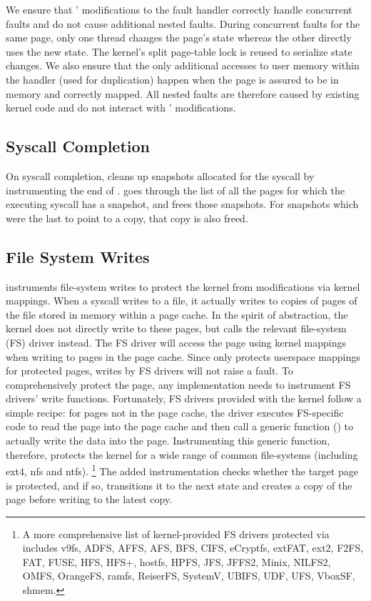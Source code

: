 We ensure that \midas' modifications to the fault handler
correctly handle concurrent faults and do not cause additional
nested faults.
During concurrent faults for the same page, only one thread
changes the page's state whereas the other directly uses the new
state.
The kernel's split page-table lock is reused to serialize state
changes.
We also ensure that the only additional accesses to user memory
within the handler (used for duplication) happen when the page
is assured to be in memory and correctly mapped.
All nested faults are therefore caused by existing kernel code
and do not interact with \midas' modifications.

\subsection{Syscall Completion}

On syscall completion, \midas cleans up snapshots allocated for
the syscall by instrumenting the end of .
\midas goes through the list of all the pages for which the
executing syscall has a snapshot, and frees those snapshots.
For snapshots which were the last to point to a copy, that
copy is also freed.


\subsection{File System Writes}

\midas instruments file-system writes to protect the kernel
from modifications via kernel mappings.
When a  syscall writes to a file, it actually
writes to copies of pages of the file stored in memory within
a page cache.
In the spirit of abstraction, the kernel does not directly write to
these pages, but calls the relevant file-system (FS) driver instead.
The FS driver will access the page using kernel mappings when writing to pages in the page cache.
Since \midas only protects userspace mappings for protected pages,
writes by FS drivers will not raise a fault.
To comprehensively protect the page, any implementation needs to
instrument FS drivers' write functions.
Fortunately, FS drivers provided with the kernel follow a simple
recipe: for pages not in the page cache, the driver executes
FS-specific code to read the page into the page cache and then
call a generic function () to actually
write the data into the page.
Instrumenting this generic function, therefore, protects the kernel
for a wide range of common file-systems (including ext4, nfs and
ntfs). \footnote{A more comprehensive list of kernel-provided FS drivers
protected via  includes v9fs, ADFS, AFFS,
AFS, BFS, CIFS, eCryptfs, extFAT, ext2, F2FS,  FAT, FUSE, HFS, HFS+,
hostfs, HPFS, JFS, JFFS2, Minix, NILFS2, OMFS, OrangeFS, ramfs, ReiserFS,
SystemV, UBIFS, UDF, UFS, VboxSF, shmem.}
The added instrumentation checks whether the target page is
protected, and if so, transitions it to the next state and
creates a copy of the page before writing to the latest copy.

